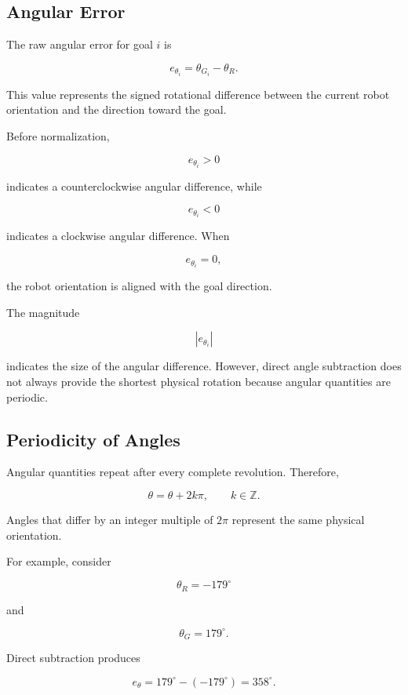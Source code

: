 \documentclass[10pt,twocolumn,a4paper]{article}
\begin{document}
\subsection{Angular Error}

The raw angular error for goal $i$ is

\begin{equation}
    e_{\theta_i} = \theta_{G_i} - \theta_R.
    \label{eq:raw_angular_error}
\end{equation}

This value represents the signed rotational difference between the current robot orientation and the direction toward the goal.

Before normalization,

\[
    e_{\theta_i} > 0
\]

indicates a counterclockwise angular difference, while

\[
    e_{\theta_i} < 0
\]

indicates a clockwise angular difference. When

\[
    e_{\theta_i} = 0,
\]

the robot orientation is aligned with the goal direction.

The magnitude

\[
    \left|e_{\theta_i}\right|
\]

indicates the size of the angular difference. However, direct angle 
subtraction does not always provide the shortest physical rotation 
because angular quantities are periodic.

\subsection{Periodicity of Angles}

Angular quantities repeat after every complete revolution. Therefore,

\[
    \theta = \theta + 2k\pi,
    \qquad
    k \in \mathbb{Z}.
\]

Angles that differ by an integer multiple of $2\pi$ represent the same 
physical orientation.

For example, consider

\[
    \theta_R = -179^\circ
\]

and

\[
    \theta_G = 179^\circ.
\]

Direct subtraction produces

\[
    e_\theta
    =
    179^\circ - \left(-179^\circ\right)
    =
    358^\circ.
\]
\end{document}
